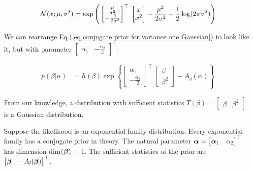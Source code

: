 \documentclass{article}
\begin{document}
\begin{equation}\begin{split}
\mathcal{N}(x; \mu, \sigma^2)  &= \exp \Bigg(   \begin{bmatrix} \frac{ \mu}{ \sigma^2}  \\ - \frac{1}{ 2 \sigma^2}   \end{bmatrix} ^\top \; \begin{bmatrix} x \\ x^2   \end{bmatrix}
 - \frac{\mu^2}{ 2 \sigma^2} - \frac{1}{2} \log ( 2 \pi \sigma^2) \Bigg)\\
\end{split}\end{equation}

We can rearrange Eq.(\ref{eq conjugate prior for variance one Gaussian}) to look like it, but with parameter $\begin{bmatrix}\alpha_1  & -\frac{\alpha_2}{2}  \end{bmatrix}^\top$:


\begin{equation}\begin{split}
p (\beta | \alpha) &= h (\beta) \exp \left\{
\begin{bmatrix}\alpha_1  \\ -\frac{\alpha_2}{2}  \end{bmatrix} ^\top \; \begin{bmatrix} \beta \\ \beta^2   \end{bmatrix}  - A_g (\alpha)	\right\}
\end{split}\end{equation}

From our knowledge, a distribution with sufficient statistics $T(\beta) = \begin{bmatrix} \beta  & \beta^2 \end{bmatrix} $ is a Gaussian distribution.

\vspace{2mm}

Suppose the likelihood is an exponential family distribution. Every exponential family has a conjugate prior in theory. The natural parameter $\boldsymbol{\alpha} = \begin{bmatrix} \boldsymbol{\alpha}_1 & \alpha_2 \end{bmatrix}^\top$ has dimension dim$(\boldsymbol{\beta})$ + 1. The sufficient statistics of the prior are $\begin{bmatrix} \boldsymbol{\beta} & -A_l(\boldsymbol{\beta})\end{bmatrix}^\top$.
\end{document}
